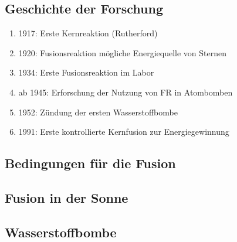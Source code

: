 \documentclass[10pt,a4paper, ngerman]{beamer}
\begin{document}
\subsection{Geschichte der Forschung}
\begin{frame}{\subsecname}{\secname}
\begin{enumerate}
\item 1917: Erste Kernreaktion (Rutherford)
\item 1920: Fusionsreaktion mögliche Energiequelle von Sternen
\item 1934: Erste Fusionsreaktion im Labor
\item ab 1945: Erforschung der Nutzung von FR in Atombomben
\item 1952: Zündung der ersten Wasserstoffbombe
\item 1991: Erste kontrollierte Kernfusion zur Energiegewinnung
\end{enumerate}
\end{frame}

\subsection{Bedingungen für die Fusion}
\begin{frame}{\subsecname}{\secname}

\end{frame}


\subsection{Fusion in der Sonne}
\begin{frame}{\subsecname}{\secname}

\end{frame}

\subsection{Wasserstoffbombe}
\begin{frame}{\subsecname}{\secname}

\end{frame}
\end{document}
